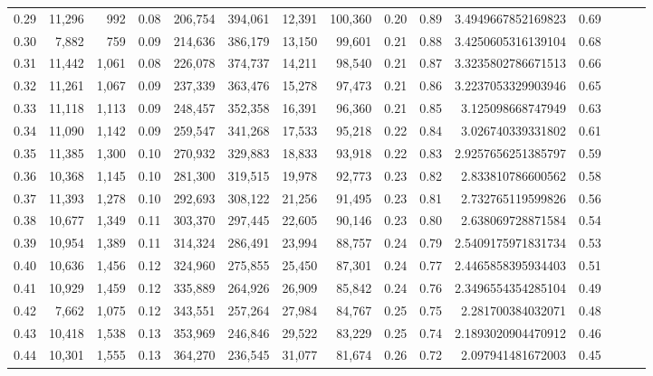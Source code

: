 \begin{tabular}{rrrrrrrrrrrrrrr}
0.29 &  11,296 &    992 &  0.08 &  206,754 &  394,061 &   12,391 &  100,360 &  0.20 &  0.89 &    3.4949667852169823 &      0.69 \\
0.30 &   7,882 &    759 &  0.09 &  214,636 &  386,179 &   13,150 &   99,601 &  0.21 &  0.88 &    3.4250605316139104 &      0.68 \\
0.31 &  11,442 &  1,061 &  0.08 &  226,078 &  374,737 &   14,211 &   98,540 &  0.21 &  0.87 &    3.3235802786671513 &      0.66 \\
0.32 &  11,261 &  1,067 &  0.09 &  237,339 &  363,476 &   15,278 &   97,473 &  0.21 &  0.86 &    3.2237053329903946 &      0.65 \\
0.33 &  11,118 &  1,113 &  0.09 &  248,457 &  352,358 &   16,391 &   96,360 &  0.21 &  0.85 &     3.125098668747949 &      0.63 \\
0.34 &  11,090 &  1,142 &  0.09 &  259,547 &  341,268 &   17,533 &   95,218 &  0.22 &  0.84 &     3.026740339331802 &      0.61 \\
0.35 &  11,385 &  1,300 &  0.10 &  270,932 &  329,883 &   18,833 &   93,918 &  0.22 &  0.83 &    2.9257656251385797 &      0.59 \\
0.36 &  10,368 &  1,145 &  0.10 &  281,300 &  319,515 &   19,978 &   92,773 &  0.23 &  0.82 &     2.833810786600562 &      0.58 \\
0.37 &  11,393 &  1,278 &  0.10 &  292,693 &  308,122 &   21,256 &   91,495 &  0.23 &  0.81 &     2.732765119599826 &      0.56 \\
0.38 &  10,677 &  1,349 &  0.11 &  303,370 &  297,445 &   22,605 &   90,146 &  0.23 &  0.80 &     2.638069728871584 &      0.54 \\
0.39 &  10,954 &  1,389 &  0.11 &  314,324 &  286,491 &   23,994 &   88,757 &  0.24 &  0.79 &    2.5409175971831734 &      0.53 \\
0.40 &  10,636 &  1,456 &  0.12 &  324,960 &  275,855 &   25,450 &   87,301 &  0.24 &  0.77 &    2.4465858395934403 &      0.51 \\
0.41 &  10,929 &  1,459 &  0.12 &  335,889 &  264,926 &   26,909 &   85,842 &  0.24 &  0.76 &    2.3496554354285104 &      0.49 \\
0.42 &   7,662 &  1,075 &  0.12 &  343,551 &  257,264 &   27,984 &   84,767 &  0.25 &  0.75 &     2.281700384032071 &      0.48 \\
0.43 &  10,418 &  1,538 &  0.13 &  353,969 &  246,846 &   29,522 &   83,229 &  0.25 &  0.74 &    2.1893020904470912 &      0.46 \\
0.44 &  10,301 &  1,555 &  0.13 &  364,270 &  236,545 &   31,077 &   81,674 &  0.26 &  0.72 &     2.097941481672003 &      0.45 \\

\end{tabular}
